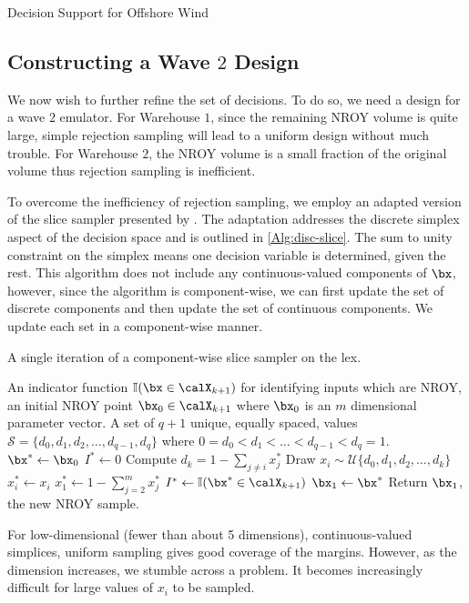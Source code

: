 \begin{chapter}{Decision Support for Offshore Wind \label{Ch:ds-for-ow}}
\subsection{Constructing a Wave $2$ Design}

We now wish to further refine the set of decisions. To do so, we need a design for a wave $2$ emulator. For Warehouse $1$, since the remaining NROY volume is quite large, simple rejection sampling will lead to a uniform design without much trouble. For Warehouse $2$, the NROY volume is a small fraction of the original volume thus rejection sampling is inefficient.

To overcome the inefficiency of rejection sampling, we employ an adapted version of the slice sampler presented by \citet{Andrianakis2017a}. The adaptation addresses the discrete simplex aspect of the decision space and is outlined in \cref{Alg:disc-slice}. The sum to unity constraint on the simplex means one decision variable is determined, given the rest. This algorithm does not include any continuous-valued components of $\bx$, however, since the algorithm is component-wise, we can first update the set of discrete components and then update the set of continuous components. We update each set in a component-wise manner.

\begin{algorithm}[h]
\caption{A single iteration of a component-wise slice sampler on the lex. \label{Alg:disc-slice}}
\begin{algorithmic}
\Require An indicator function $\mathbb{I}(\bx \in \calX_{k+1})$ for identifying inputs which are NROY, an initial NROY point $\bx_0 \in \calX_{k+1}$ where $\bx_0$ is an $m$ dimensional parameter vector. A set of $q+1$ unique, equally spaced, values $\mathcal{S} = \{ d_0, d_1, d_2, \ldots, d_{q-1},  d_q \}$ where $0 = d_0 <  d_1 < \ldots < d_{q-1}  <  d_q = 1$.
\State $\bx^{*} \gets \bx_0$
  \State $I^{*} \gets 0$ 
    \State Compute $d_k = 1 - \sum_{j \neq i} x^{*}_j$
    \State Draw $x_i \sim \mathcal{U} \{ d_0, d_1, d_2, \ldots, d_k  \}$ 
    \State $x^{*}_i \gets x_i$
    \State $x^{*}_1 \gets 1 - \sum_{j = 2}^m  x_j^{*}$ 
    \State $I^{*}  \gets \mathbb{I}(\bx^{*} \in \calX_{k+1})$ 
  \EndWhile
\EndFor
\State $\bx_1 \gets \bx^{*}$ 
\State Return $\bx_1$, the new NROY sample.
\end{algorithmic}
\end{algorithm}
For low-dimensional (fewer than about 5 dimensions), continuous-valued simplices, uniform sampling gives good coverage of the margins. However, as the dimension increases, we stumble across a problem. It becomes increasingly difficult for large values of $x_i$ to be sampled.


\end{chapter}
